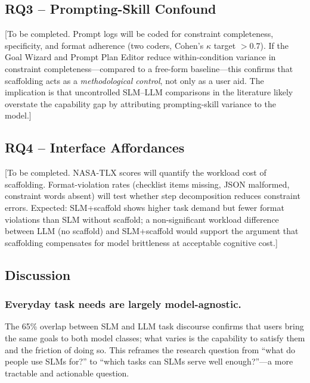 \subsection{RQ3 -- Prompting-Skill Confound}

[To be completed.
Prompt logs will be coded for constraint completeness, specificity, and format
adherence (two coders, Cohen's $\kappa$ target $> 0.7$).
If the Goal Wizard and Prompt Plan Editor reduce within-condition variance in
constraint completeness---compared to a free-form baseline---this confirms that
scaffolding acts as a \textit{methodological control}, not only as a user aid.
The implication is that uncontrolled SLM--LLM comparisons in the literature
likely overstate the capability gap by attributing prompting-skill variance to
the model.]

\subsection{RQ4 -- Interface Affordances}

[To be completed.
NASA-TLX scores will quantify the workload cost of scaffolding.
Format-violation rates (checklist items missing, JSON malformed, constraint
words absent) will test whether step decomposition reduces constraint errors.
Expected: SLM+scaffold shows higher task demand but fewer format violations
than SLM without scaffold; a non-significant workload difference between
LLM (no scaffold) and SLM+scaffold would support the argument that
scaffolding compensates for model brittleness at acceptable cognitive cost.]

\subsection{Discussion}

\subsubsection{Everyday task needs are largely model-agnostic.}
The 65\% overlap between SLM and LLM task discourse confirms that users bring
the same goals to both model classes; what varies is the capability to satisfy
them and the friction of doing so.
This reframes the research question from ``what do people use SLMs for?''
to ``which tasks can SLMs serve well enough?''---a more tractable and
actionable question.

